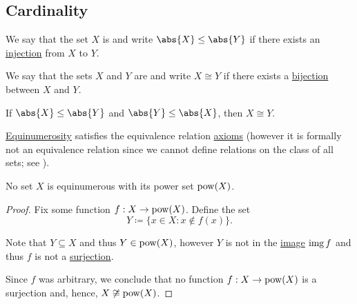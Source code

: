 \subsection{Cardinality}\label{subsec:cardinality}

\begin{definition}\label{def:set_domination}\mcite\cite[145]{Enderton1977Sets}
  We say that the set \( X \) is  and write \( \abs{X} \leq \abs{Y} \) if there exists an \hyperref[def:function_invertibility/injection]{injection} from \( X \) to \( Y \).
\end{definition}

\begin{definition}\label{def:equinumerous_sets}\mcite\cite[129]{Enderton1977Sets}
  We say that the sets \( X \) and \( Y \) are  and write \( X \cong Y \) if there exists a \hyperref[def:function_invertibility/bijection]{bijection} between \( X \) and \( Y \).
\end{definition}

\begin{theorem}\label{thm:cantor_schroder_bernstein}\mcite\cite[147]{Enderton1977Sets}
  If \( \abs{X} \leq \abs{Y} \) and \( \abs{Y} \leq \abs{X} \), then \( X \cong Y \).
\end{theorem}

\medskip

\begin{proposition}\label{thm:equinumerousity_equivalence}\mcite\cite[thm. 6A]{Enderton1977Sets}
  \hyperref[def:equinumerous_sets]{Equinumerosity} satisfies the equivalence relation \hyperref[def:equivalence_relation]{axioms} (however it is formally not an equivalence relation since we cannot define relations on the class of all sets; see ).
\end{proposition}

\begin{theorem}[Cantor]\label{thm:cantor_power_set_theorem}\mcite\cite[thm. 6B]{Enderton1977Sets}
  No set \( X \) is equinumerous with its power set \( \operatorname{pow}(X) \).
\end{theorem}
\begin{proof}
  Fix some function \( f: X \to \operatorname{pow}(X) \). Define the set
  \begin{equation*}
    Y \coloneqq \{ x \in X \colon x \not\in f(x) \}.
  \end{equation*}

  Note that \( Y \subseteq X \) and thus \( Y \in \operatorname{pow}(X) \), however \( Y \) is not in the \hyperref[def:function]{image} \( \operatorname{img} f \) and thus \( f \) is not a \hyperref[def:function_invertibility/surjection]{surjection}.

  Since \( f \) was arbitrary, we conclude that no function \( f: X \to \operatorname{pow}(X) \) is a surjection and, hence, \( X \not\cong \operatorname{pow}(X) \).
\end{proof}


